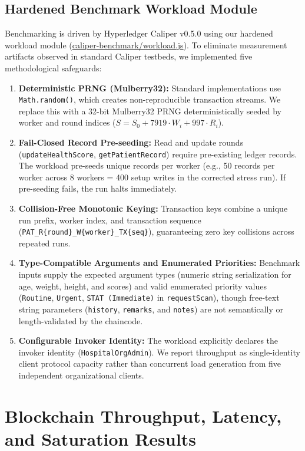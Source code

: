 \documentclass[runningheads]{llncs}
\begin{document}
\subsection{Hardened Benchmark Workload Module}
Benchmarking is driven by Hyperledger Caliper v0.5.0 using our hardened workload module (\url{caliper-benchmark/workload.js}). To eliminate measurement artifacts observed in standard Caliper testbeds, we implemented five methodological safeguards:
\begin{enumerate}
    \item \textbf{Deterministic PRNG (Mulberry32):} Standard implementations use \texttt{Math.random()}, which creates non-reproducible transaction streams. We replace this with a 32-bit Mulberry32 PRNG deterministically seeded by worker and round indices ($S = S_0 + 7919 \cdot W_i + 997 \cdot R_i$).
    \item \textbf{Fail-Closed Record Pre-seeding:} Read and update rounds (\texttt{updateHealthScore}, \texttt{getPatientRecord}) require pre-existing ledger records. The workload pre-seeds unique records per worker (e.g., 50 records per worker across 8 workers = 400 setup writes in the corrected stress run). If pre-seeding fails, the run halts immediately.
    \item \textbf{Collision-Free Monotonic Keying:} Transaction keys combine a unique run prefix, worker index, and transaction sequence (\texttt{PAT\_R\{round\}\_W\{worker\}\_TX\{seq\}}), guaranteeing zero key collisions across repeated runs.
    \item \textbf{Type-Compatible Arguments and Enumerated Priorities:} Benchmark inputs supply the expected argument types (numeric string serialization for age, weight, height, and scores) and valid enumerated priority values (\texttt{Routine}, \texttt{Urgent}, \texttt{STAT (Immediate)} in \texttt{requestScan}), though free-text string parameters (\texttt{history}, \texttt{remarks}, and \texttt{notes}) are not semantically or length-validated by the chaincode.
    \item \textbf{Configurable Invoker Identity:} The workload explicitly declares the invoker identity (\texttt{HospitalOrgAdmin}). We report throughput as single-identity client protocol capacity rather than concurrent load generation from five independent organizational clients.
\end{enumerate}

\section{Blockchain Throughput, Latency, and Saturation Results}
\end{document}
